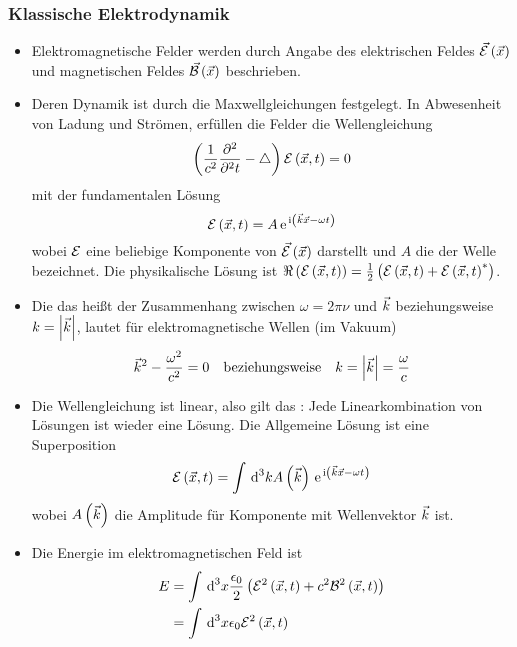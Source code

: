 \subsubsection{Klassische Elektrodynamik}
\begin{itemize}
  \item Elektromagnetische Felder werden durch Angabe des elektrischen Feldes $\vE\of{\vX}$ und magnetischen Feldes $\vB\of{\vX}$ beschrieben.
  \item Deren Dynamik ist durch die Maxwellgleichungen festgelegt. In Abwesenheit von Ladung und Strömen, erfüllen die Felder die Wellengleichung
    \begin{equation}
      \norBra{\frac{1}{c^2}\nppv{}{t}{2} - \Laplace} \E\of{\vX,t} = 0
    \end{equation}
  mit der fundamentalen Lösung
    \begin{equation}
      \E\of{\vX,t} = A \e{\mI\norBra{\vK\vX- \omega t}}
    \end{equation}
  wobei $\E$ eine beliebige Komponente von $\vE\of{\vX}$ darstellt und $A$ die  der Welle bezeichnet. Die physikalische Lösung ist $\Re\of{\E\of{\vX,t}} = \frac{1}{2}\norBra{\E\of{\vX,t} + \E\of{\vX,t}^*}$.
  \item Die  das heißt der Zusammenhang zwischen  $\omega = 2 \pi \nu$ und  $\vK$ beziehungsweise  $k = \Norm{\vK}$, lautet für elektromagnetische Wellen (im Vakuum)
  \begin{equation}
    \vK^2 - \frac{\omega^2}{c^2} = 0 \quad \text{beziehungsweise} \quad k = \Norm{\vK} = \frac{\omega}{c}
  \end{equation}
  \item Die Wellengleichung ist linear, also gilt das : Jede Linearkombination von Lösungen ist wieder eine Lösung. Die Allgemeine Lösung ist eine Superposition
  \begin{equation}
    \E\of{\vX,t} = \int\dn{k}{3} A\of{\vK} \e{\mI\norBra{\vK\vX - \omega t}}
  \end{equation}
  wobei $A\of{\vK}$ die Amplitude für Komponente mit Wellenvektor $\vK$ ist.
  \item Die Energie im elektromagnetischen Feld ist
  \begin{align}
    E & = \int \dn{x}{3} \frac{\epsilon_0}{2}\norBra{\E^2\of{\vX,t}+ c^2\B^2\of{\vX,t}} \\
      & = \int \dn{x}{3} \epsilon_0 \E^2\of{\vX,t}
  \end{align}

\end{itemize}
